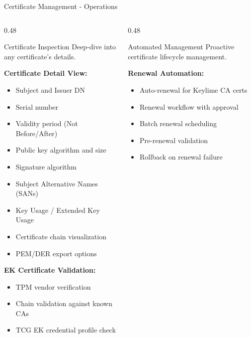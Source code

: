 \begin{frame}{Certificate Management - Operations}
  \begin{columns}[T]
    \begin{column}{0.48\textwidth}
      \begin{block}{Certificate Inspection}
        \scriptsize
        Deep-dive into any certificate's details.
      \end{block}

      \vspace{0.1cm}
      \scriptsize

      \textbf{Certificate Detail View:}
      \begin{itemize}
        \item Subject and Issuer DN
        \item Serial number
        \item Validity period (Not Before/After)
        \item Public key algorithm and size
        \item Signature algorithm
        \item Subject Alternative Names (SANs)
        \item Key Usage / Extended Key Usage
        \item Certificate chain visualization
        \item PEM/DER export options
      \end{itemize}

      \vspace{0.1cm}

      \textbf{EK Certificate Validation:}
      \begin{itemize}
        \item TPM vendor verification
        \item Chain validation against known CAs
        \item TCG EK credential profile check
      \end{itemize}
    \end{column}
    \begin{column}{0.48\textwidth}
      \begin{block}{Automated Management}
        \scriptsize
        Proactive certificate lifecycle management.
      \end{block}

      \vspace{0.1cm}
      \scriptsize

      \textbf{Renewal Automation:}
      \begin{itemize}
        \item Auto-renewal for Keylime CA certs
        \item Renewal workflow with approval
        \item Batch renewal scheduling
        \item Pre-renewal validation
        \item Rollback on renewal failure
      \end{itemize}


\end{column}
\end{columns}
\end{frame}
